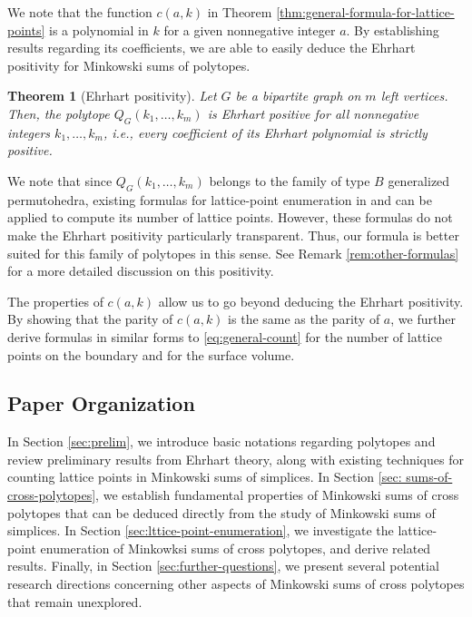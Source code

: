 \documentclass[11pt,a4paper]{article}
\newcommand{\1}{\mathbf{1}}
\theoremstyle{plain}
\newtheorem{theorem}{Theorem}[section]
\theoremstyle{definition}
\begin{document}
We note that the function $c(a,k)$ in Theorem \ref{thm:general-formula-for-lattice-points} is a polynomial in $k$ for a given nonnegative integer $a$. By establishing results regarding its coefficients, we are able to easily deduce the Ehrhart positivity for Minkowski sums of polytopes. 

\begin{theorem}[Ehrhart positivity]\label{thm:positivity}
Let $G$ be a bipartite graph on $m$ left vertices. Then, the polytope $Q_G(k_1, \dots, k_m)$ is Ehrhart positive for all nonnegative integers $k_1, \dots, k_m$, i.e., every coefficient of its Ehrhart polynomial is strictly positive.
\end{theorem}

We note that since
$Q_G(k_1,\ldots,k_m)$ belongs to the family of type $B$ generalized
permutohedra, existing formulas for lattice-point enumeration in \cite{Euretall2024} and \cite{thawinrak2025AtoB} can be applied to compute its number of lattice points. However, these formulas do not make the Ehrhart positivity particularly
transparent. Thus, our formula is better suited for this family of polytopes in this sense. See Remark \ref{rem:other-formulas} for a more detailed discussion on this positivity.

The properties of $c(a,k)$ allow us to go beyond deducing the Ehrhart positivity. By showing that the parity of $c(a,k)$ is the same as the parity of $a$, we further derive formulas in similar forms to \eqref{eq:general-count} for the number of lattice points on the boundary and for the surface volume.

\subsection*{Paper Organization}

In Section \ref{sec:prelim}, we introduce basic notations regarding polytopes and review preliminary results from Ehrhart theory, along with existing techniques for counting lattice points in Minkowski sums of simplices. In Section \ref{sec: sums-of-cross-polytopes}, we establish fundamental properties of Minkowski sums of cross polytopes that can be deduced directly from the study of Minkowski sums of simplices. In Section \ref{sec:lttice-point-enumeration}, we investigate the lattice-point enumeration of Minkowksi sums of cross polytopes, and derive related results. Finally, in Section \ref{sec:further-questions}, we present several potential research directions concerning other aspects of Minkowski sums of cross polytopes that remain unexplored.    
\end{document}
